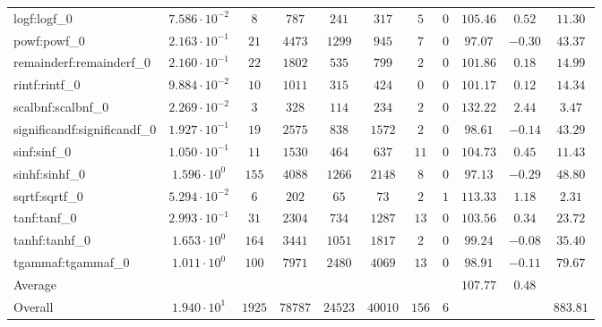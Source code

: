 \begin{tabular}{|l|c|c|c|c|c|c|c|c|c|c|}
logf:logf\_0                 & $ 7.586 \cdot 10^{-2} $ & $ 8      $ & $ 787   $ & $ 241   $ & $ 317   $ & $ 5   $ & $ 0 $ & $ 105.46      $ & $ 0.52    $ & $ 11.30   $ \\
powf:powf\_0                 & $ 2.163 \cdot 10^{-1} $ & $ 21     $ & $ 4473  $ & $ 1299  $ & $ 945   $ & $ 7   $ & $ 0 $ & $ 97.07       $ & $ -0.30   $ & $ 43.37   $ \\
remainderf:remainderf\_0     & $ 2.160 \cdot 10^{-1} $ & $ 22     $ & $ 1802  $ & $ 535   $ & $ 799   $ & $ 2   $ & $ 0 $ & $ 101.86      $ & $ 0.18    $ & $ 14.99   $ \\
rintf:rintf\_0               & $ 9.884 \cdot 10^{-2} $ & $ 10     $ & $ 1011  $ & $ 315   $ & $ 424   $ & $ 0   $ & $ 0 $ & $ 101.17      $ & $ 0.12    $ & $ 14.34   $ \\
scalbnf:scalbnf\_0           & $ 2.269 \cdot 10^{-2} $ & $ 3      $ & $ 328   $ & $ 114   $ & $ 234   $ & $ 2   $ & $ 0 $ & $ 132.22      $ & $ 2.44    $ & $ 3.47    $ \\
significandf:significandf\_0 & $ 1.927 \cdot 10^{-1} $ & $ 19     $ & $ 2575  $ & $ 838   $ & $ 1572  $ & $ 2   $ & $ 0 $ & $ 98.61       $ & $ -0.14   $ & $ 43.29   $ \\
sinf:sinf\_0                 & $ 1.050 \cdot 10^{-1} $ & $ 11     $ & $ 1530  $ & $ 464   $ & $ 637   $ & $ 11  $ & $ 0 $ & $ 104.73      $ & $ 0.45    $ & $ 11.43   $ \\
sinhf:sinhf\_0               & $ 1.596 \cdot 10^{0}  $ & $ 155    $ & $ 4088  $ & $ 1266  $ & $ 2148  $ & $ 8   $ & $ 0 $ & $ 97.13       $ & $ -0.29   $ & $ 48.80   $ \\
sqrtf:sqrtf\_0               & $ 5.294 \cdot 10^{-2} $ & $ 6      $ & $ 202   $ & $ 65    $ & $ 73    $ & $ 2   $ & $ 1 $ & $ 113.33      $ & $ 1.18    $ & $ 2.31    $ \\
tanf:tanf\_0                 & $ 2.993 \cdot 10^{-1} $ & $ 31     $ & $ 2304  $ & $ 734   $ & $ 1287  $ & $ 13  $ & $ 0 $ & $ 103.56      $ & $ 0.34    $ & $ 23.72   $ \\
tanhf:tanhf\_0               & $ 1.653 \cdot 10^{0}  $ & $ 164    $ & $ 3441  $ & $ 1051  $ & $ 1817  $ & $ 2   $ & $ 0 $ & $ 99.24       $ & $ -0.08   $ & $ 35.40   $ \\
tgammaf:tgammaf\_0           & $ 1.011 \cdot 10^{0}  $ & $ 100    $ & $ 7971  $ & $ 2480  $ & $ 4069  $ & $ 13  $ & $ 0 $ & $ 98.91       $ & $ -0.11   $ & $ 79.67   $ \\
\hline
Average                      & $                     $ & $        $ & $       $ & $       $ & $       $ & $     $ & $   $ & $ 107.77      $ & $ 0.48    $ & $         $ \\
\hline
Overall                      & $ 1.940 \cdot 10^{1}  $ & $ 1925   $ & $ 78787 $ & $ 24523 $ & $ 40010 $ & $ 156 $ & $ 6 $ & $             $ & $         $ & $ 883.81  $ \\
\hline
\end{tabular}
